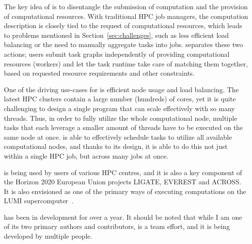 The key idea of \hyperqueue{} is to disentangle the submission of computation and the provision of
computational resources. With traditional HPC job managers, the computation description is
closely tied to the request of computational resources, which leads to problems mentioned in
Section~\ref{sec:challenges}, such as less efficient load balancing or the need to manually
aggregate tasks into jobs. \hyperqueue{} separates these two actions; users submit task graphs
independently of providing computational resources (workers) and let the task runtime take care of
matching them together, based on requested resource requirements and other constraints.

One of the driving use-cases for \hyperqueue{} is efficient node usage and load balancing. The
latest HPC clusters contain a large number (hundreds) of cores, yet it is quite challenging to
design a single program that can scale effectively with so many threads. Thus, in order to fully
utilize the whole computational node, multiple tasks that each leverage a smaller amount of
threads have to be executed on the same node at once. \hyperqueue{} is able to effectively schedule
tasks to utilize all available computational nodes, and thanks to its design, it is able to do this
not just within a single HPC job, but across many jobs at once.

\hyperqueue{} is being used by users of various HPC centres, and it is also a key
component of the Horizon 2020 European Union projects
LIGATE,
EVEREST and
ACROSS. It is also envisioned as one of the primary ways of
executing computations on the LUMI supercomputer~\cite{lumi_it4innovations_2022}.

\hyperqueue{} has been in development for over a year. It should be noted that while I am one of
its two primary authors and contributors, \hyperqueue{} is a team effort, and it is being
developed by multiple people.
